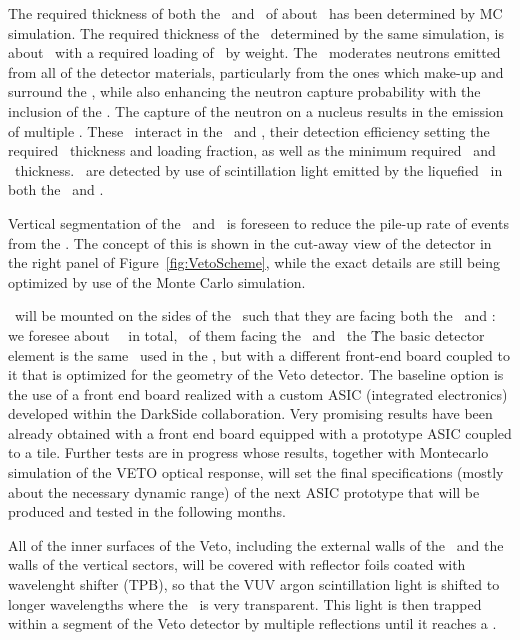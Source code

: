 The required thickness of both the \IAB\ and \OAB\ of about \DSkVetoOABThickness\ has been determined by MC simulation. The required thickness of the \GdAS\, determined by the same simulation,  is about \DSkVetoGdASThickness\ with a required  loading of \DSkVetoGdPercentage\ by weight.  The \GdAS\ moderates neutrons emitted from all of the detector materials, particularly from the ones which make-up and surround the \LArTPC, while also enhancing the neutron capture probability with the inclusion of the .  The capture of the neutron on a  nucleus results in the emission of multiple \grs.  These \grs\ interact in the \IAB\ and \OAB, their detection efficiency setting the required \GdAS\ thickness and  loading fraction, as well as the minimum required \IAB\ and \OAB\ thickness.  \grs\ are detected by use of scintillation light emitted by the liquefied \AAr\ in both the \IAB\ and \OAB. 

Vertical segmentation of the \IAB\ and \OAB\ is foreseen to reduce the pile-up rate of  events from the \AAr.  The concept of this is shown in the cut-away view of the detector in the right panel of Figure~\ref{fig:VetoScheme}, while the exact details are still being optimized by use of the Monte Carlo simulation. 

\SiPMs\ will be mounted on the sides of the \GdAS\ such that they are facing both the \IAB\ and \OAB: we foresee about \DSkVetoTotalPDMs\ \SiPMs\ in total, \DSkVetoIABPDMs\ of them facing the \IAB\ and \DSkVetoOABPDMs\ the \OAB\. The basic detector element is the same \DSkPdm\ used in the \TPC, but with a different front-end board coupled to it that is optimized for the geometry of the Veto detector. 
The baseline option is the use of a front end board realized with a custom ASIC (integrated electronics) developed
within the DarkSide collaboration.
 Very promising results have been already obtained with 
a front end board equipped with a prototype ASIC coupled to a tile.
Further tests are in progress whose results, together with Montecarlo simulation of the VETO optical response, will set the final specifications (mostly about the necessary dynamic range) of the next ASIC prototype that will be produced and tested in the following months.

All of the inner surfaces of the Veto, including the external walls of the \TPC\ and the walls of the vertical sectors, will be covered with reflector foils coated with wavelenght shifter (TPB), so that the VUV argon scintillation light is shifted to longer wavelengths where the \LAr\ is very transparent. This light is then trapped within a segment of the Veto detector by multiple reflections until it reaches a \SiPM. 

